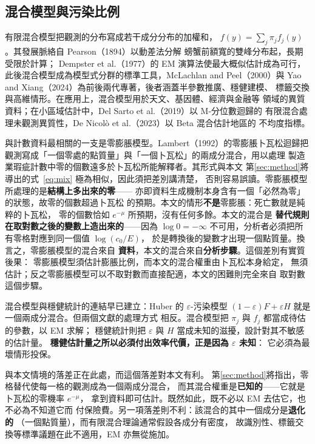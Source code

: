 \documentclass[UTF8, fontset=macnew, a4paper, 12pt]{ctexart}
\begin{document}
\subsection{混合模型與污染比例}

有限混合模型把觀測的分布寫成若干成分分布的加權和，
$f(y)=\sum_{j}\pi_j f_j(y)$。其發展脈絡自 Pearson（1894）以動差法分解
螃蟹前額寬的雙峰分布起，長期受限於計算；
Dempster et al.（1977）的 EM 演算法使最大概似估計成為可行，
此後混合模型成為模型式分群的標準工具，McLachlan and Peel（2000）與
Yao and Xiang（2024）為前後兩代專著，後者涵蓋半參數推廣、穩健建模、
標籤交換與高維情形。在應用上，混合模型用於天文、基因體、經濟與金融等
領域的異質資料；在小區域估計中，Del Sarto et al.（2019）以 M-分位數迴歸的
有限混合處理未觀測異質性，De Nicol\`o et al.（2023）以 Beta 混合估計地區的
不均度指標。

與計數資料最相關的一支是零膨脹模型。Lambert（1992）的零膨脹卜瓦松迴歸把
觀測寫成「一個零處的點質量」與「一個卜瓦松」的兩成分混合，用以處理
製造業瑕疵計數中零的個數遠多於卜瓦松所能解釋者。其形式與本文
第\ref{sec:method}將導出的式~\eqref{eq:mix} 極為相似，因此須把差別講清楚，
否則容易誤讀。零膨脹模型所處理的是\textbf{結構上多出來的零}——
亦即資料生成機制本身含有一個「必然為零」的狀態，故零的個數超過卜瓦松
的預期。本文的情形\textbf{不是}零膨脹：死亡數就是純粹的卜瓦松，
零的個數恰如 $e^{-\mu}$ 所預期，沒有任何多餘。本文的混合是
\textbf{替代規則在取對數之後的變數上造出來的}——因為 $\log 0=-\infty$
不可用，分析者必須把所有零格對應到同一個值 $\log(c_0/E)$，
於是轉換後的變數才出現一個點質量。換言之，零膨脹模型的混合來自
\textbf{資料}，本文的混合來自\textbf{分析步驟}。這個差別有實質後果：
零膨脹模型須估計膨脹比例，而本文的混合權重由卜瓦松本身給定，
無須估計；反之零膨脹模型可以不取對數而直接配適，本文的困難則完全來自
取對數這個步驟。

混合模型與穩健統計的連結早已建立：Huber 的 $\varepsilon$-污染模型
$(1-\varepsilon)F+\varepsilon H$ 就是一個兩成分混合。但兩個文獻的處理方式
相反。混合模型把 $\pi_j$ 與 $f_j$ 都當成待估的參數，以 EM 求解；
穩健統計則把 $\varepsilon$ 與 $H$ 當成未知的滋擾，設計對其不敏感的估計量。
\textbf{穩健估計量之所以必須付出效率代價，正是因為 $\varepsilon$ 未知}：
它必須為最壞情形投保。

與本文情境的落差正在此處，而這個落差對本文有利。
第\ref{sec:method}將指出，零格替代使每一格的觀測成為一個兩成分混合，
而其混合權重是\textbf{已知的}——它就是卜瓦松的零機率 $e^{-\mu}$，
拿到資料即可估計。既然如此，既不必以 EM 去估它，也不必為不知道它而
付保險費。另一項落差則不利：該混合的其中一個成分是\textbf{退化的}
（一個點質量），而有限混合理論通常假設各成分有密度，
故識別性、標籤交換等標準議題在此不適用，EM 亦無從施加。
\end{document}
